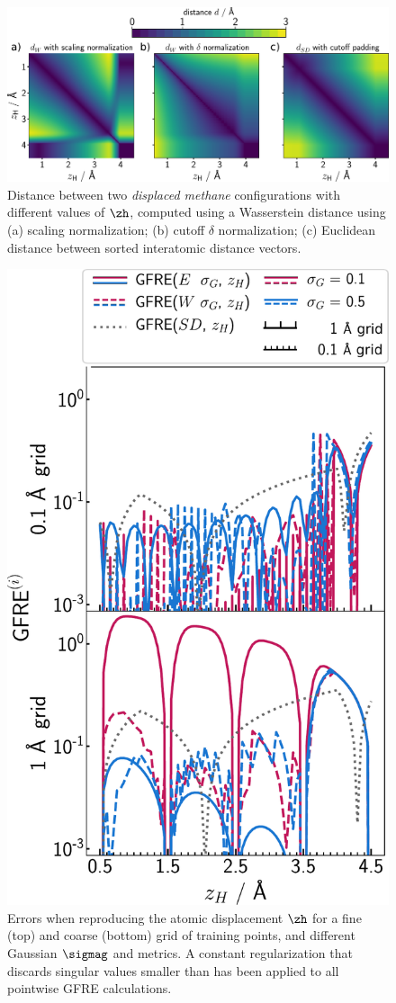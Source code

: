 \begin{figure}
    \centering
    \includegraphics[width=0.77\linewidth]{fig/rof/displace_wasserstein_distance_plots.pdf}
    \caption{Distance between two \emph{displaced methane} configurations with different values of $\zh$, computed using a Wasserstein distance using (a) scaling normalization; (b) cutoff $\delta$ normalization; (c) Euclidean distance between sorted interatomic distance vectors.}
    \label{fig:wasserstein-distances}
\end{figure}

\begin{figure}
  \centering
  \includegraphics[width=0.45\linewidth]{fig/rof/test_errors-displaced_methane-2x1-inkscaped-ver2.pdf}
\caption{
Errors when reproducing the atomic displacement $\zh$ for a fine (top) and coarse (bottom) grid of training points, and different Gaussian $\sigmag$ and metrics. A constant regularization that discards singular values smaller than  has been applied to all pointwise GFRE calculations.}
\label{fig:wasserstein-grid}
\end{figure}

